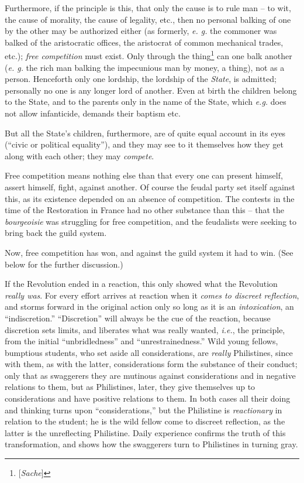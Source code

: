 Furthermore, if the principle is this, that only the cause is to rule man -- 
to wit, the cause of morality, the cause of legality, etc., then no personal 
balking of one by the other may be authorized either (as formerly, \textit{e. 
g.} the commoner was balked of the aristocratic offices, the aristocrat of 
common mechanical trades, etc.); \textit{free competition} must exist. Only 
through the thing\footnote{[\textit{Sache}]} can one balk another (\textit{e. 
g.} the rich man balking the impecunious man by money, a thing), not as a 
person. Henceforth only one lordship, the lordship of the \textit{State}, is 
admitted; personally no one is any longer lord of another. Even at birth the 
children belong to the State, and to the parents only in the name of the 
State, which \textit{e.g.} does not allow infanticide, demands their baptism 
etc.

But all the State's children, furthermore, are of quite equal account in its 
eyes (``civic or political equality''), and they may see to it themselves 
how they get along with each other; they may \textit{compete}.

Free competition means nothing else than that every one can present himself, 
assert himself, fight, against another. Of course the feudal party set itself 
against this, as its existence depended on an absence of competition. The 
contests in the time of the Restoration in France had no other substance than 
this -- that the \textit{bourgeoisie} was struggling for free competition, and 
the feudalists were seeking to bring back the guild system.

Now, free competition has won, and against the guild system it had to win. 
(See below for the further discussion.)

If the Revolution ended in a reaction, this only showed what the Revolution 
\textit{really was}. For every effort arrives at reaction when it 
\textit{comes to discreet reflection}, and storms forward in the original 
action only so long as it is an \textit{intoxication}, an ``indiscretion.'' 
``Discretion'' will always be the cue of the reaction, because discretion 
sets limits, and liberates what was really wanted, \textit{i.e.}, the 
principle, from the initial ``unbridledness'' and ``unrestrainedness.'' 
Wild young fellows, bumptious students, who set aside all considerations, are 
\textit{really} Philistines, since with them, as with the latter, 
considerations form the substance of their conduct; only that as swaggerers 
they are mutinous against considerations and in negative relations to them, 
but as Philistines, later, they give themselves up to considerations and have 
positive relations to them. In both cases all their doing and thinking turns 
upon ``considerations,'' but the Philistine is \textit{reactionary} in 
relation to the student; he is the wild fellow come to discreet reflection, as 
the latter is the unreflecting Philistine. Daily experience confirms the truth 
of this transformation, and shows how the swaggerers turn to Philistines in 
turning gray.

